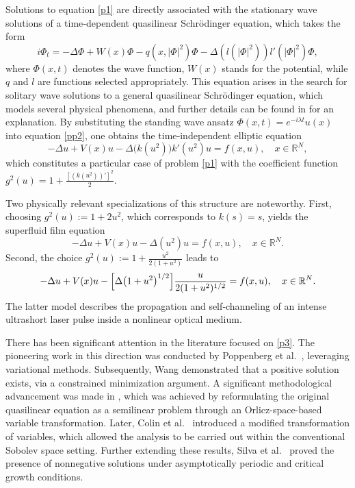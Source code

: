 \documentclass[reqno]{amsart}
\begin{document}
Solutions to equation \eqref{p1} are directly associated with the stationary wave solutions of a 
time‑dependent quasilinear Schr\"odinger equation, which takes the form
\begin{equation}
\label{pp2}
i\Phi_t=-\Delta \Phi+W(x)\Phi-q(x,|\Phi|^2)\Phi-\Delta(l(|\Phi|^2))l'(|\Phi|^2)\Phi,
\end{equation}
where $\Phi(x,t)$ denotes the wave function, $W(x)$ stands for  the  potential, while $q$ and $l$  
are functions selected appropriately. 
This equation arises in the search for solitary wave solutions to a general quasilinear 
Schr\"odinger equation, which models several physical phenomena, and further details can be 
found in \cite{Wang2, Wang1, Poppenberg} for an explanation. 
By substituting the standing wave ansatz $\Phi(x,t)=e^{-i\lambda t}u(x)$ into equation \eqref{pp2}, 
one obtains the time‑independent elliptic equation
\begin{equation}
\label{p2}
-\Delta u+V(x)u-\Delta\bigl(k(u^2)\bigr)k'(u^2)u=f(x,u), \quad x\in \mathbb{R}^{N},
\end{equation}
which constitutes a particular case of problem \eqref{p1} with the coefficient function 
$g^2(u)=1+\frac{[(k(u^2))']^2}{2}$.

Two physically relevant specializations of this structure are noteworthy.
First, choosing $g^2(u):=1+2u^2$, which corresponds to $k(s)=s$, yields the superfluid film 
equation 
\begin{equation}
\label{p3}
-\Delta u+V(x)u-\Delta(u^{2})u=f(x,u), \quad x\in \mathbb{R}^{N}.
\end{equation}
Second, the choice $g^2(u):=1+\frac{u^2}{2(1+u^2)}$ leads to
\begin{equation}
\label{p4}
-\Delta u+V(x)u-\Bigl[\Delta\bigl(1+u^{2}\bigr)^{1/2}\Bigr]\frac{u}{2(1+u^{2})^{1/2}}=
f(x,u), \quad x\in \mathbb{R}^{N}.
\end{equation}
The latter model describes the propagation and self‑channeling of an intense ultrashort laser 
pulse inside a nonlinear optical medium.

There has been significant attention in the literature focused on  \eqref{p3}. 
The pioneering work in this direction was conducted by Poppenberg et al.\ \cite{Poppenberg}, leveraging variational methods. Subsequently, Wang \cite{Wang1} demonstrated that a positive 
solution exists, via a constrained minimization argument. A significant methodological advancement 
was made in \cite{Wang2}, which was achieved by reformulating the original quasilinear equation as 
a semilinear problem through an Orlicz-space-based variable transformation. Later, Colin et al.\ 
\cite{colin} introduced a modified transformation of variables, which allowed the analysis to be 
carried out within the conventional Sobolev space setting. Further extending these results, 
Silva et al.\ \cite{Silva} proved the presence of  nonnegative  solutions under asymptotically 
periodic and critical growth conditions.
\end{document}
